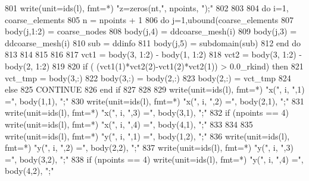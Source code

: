 \begin{DoxyCode}
{801         \textcolor{keyword}{write}(unit=ids(l), fmt=*) \textcolor{stringliteral}{"z=zeros(nt,"}, npoints, \textcolor{stringliteral}{");"}
802 
803 
804         \textcolor{keywordflow}{do} i=1, coarse_elements%
805           n = npoints + 1
806           \textcolor{keywordflow}{do} j=1,ubound(coarse_elements%
807             body(j,1:2) = coarse_nodes%
808             body(j,4) = ddcoarse_mesh(i)%
809             body(j,3) = ddcoarse_mesh(i)%
810             sub = ddinfo%
811             body(j,5) = subdomain(sub)%
812 \textcolor{keywordflow}{          end do}
813           
814         
815 
816           
817           vct1 = body(3, 1:2) - body(1, 1:2) 
818           vct2 = body(3, 1:2) - body(2, 1:2)
819           
820           \textcolor{keywordflow}{if} ( (vct1(1)*vct2(2)-vct1(2)*vct2(1)) > 0.0\_rkind) \textcolor{keywordflow}{then}
821             vct\_tmp = body(3,:)
822             body(3,:) = body(2,:)
823             body(2,:) = vct\_tmp
824           \textcolor{keywordflow}{else}
825             \textcolor{keywordflow}{CONTINUE}
826 \textcolor{keywordflow}{          end if}
827 
828 
829           \textcolor{keyword}{write}(unit=ids(l), fmt=*) \textcolor{stringliteral}{"x("}, i, \textcolor{stringliteral}{",1) ="}, body(1,1), \textcolor{stringliteral}{";"}
830           \textcolor{keyword}{write}(unit=ids(l), fmt=*) \textcolor{stringliteral}{"x("}, i, \textcolor{stringliteral}{",2) ="}, body(2,1), \textcolor{stringliteral}{";"}
831           \textcolor{keyword}{write}(unit=ids(l), fmt=*) \textcolor{stringliteral}{"x("}, i, \textcolor{stringliteral}{",3) ="}, body(3,1), \textcolor{stringliteral}{";"}
832           \textcolor{keywordflow}{if} (npoints == 4) \textcolor{keyword}{write}(unit=ids(l), fmt=*) \textcolor{stringliteral}{"x("}, i, \textcolor{stringliteral}{",4) ="}, body\textcolor{comment}{(4,1), }\textcolor{stringliteral}{";"}
833 
834 
835           \textcolor{keyword}{write}(unit=ids(l), fmt=*) \textcolor{stringliteral}{"y("}, i, \textcolor{stringliteral}{",1) ="}, body(1,2), \textcolor{stringliteral}{";"}
836           \textcolor{keyword}{write}(unit=ids(l), fmt=*) \textcolor{stringliteral}{"y("}, i, \textcolor{stringliteral}{",2) ="}, body(2,2), \textcolor{stringliteral}{";"}
837           \textcolor{keyword}{write}(unit=ids(l), fmt=*) \textcolor{stringliteral}{"y("}, i, \textcolor{stringliteral}{",3) ="}, body(3,2), \textcolor{stringliteral}{";"}
838           \textcolor{keywordflow}{if} (npoints == 4) \textcolor{keyword}{write}(unit=ids(l), fmt=*) \textcolor{stringliteral}{"y("}, i, \textcolor{stringliteral}{",4) ="}, body(4,\textcolor{comment}{2), }\textcolor{stringliteral}{";"}
}
\end{DoxyCode}
